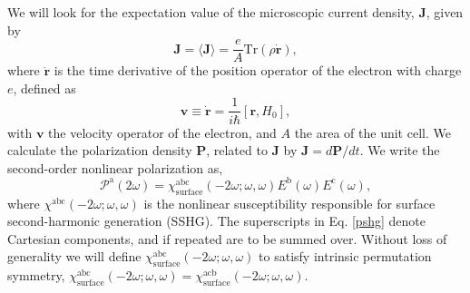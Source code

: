 We will look for the expectation value of the microscopic current density,
$\mathbf{J}$, given by
\begin{equation*}
\mathbf{J} = \langle{\mathbf{J}}\rangle 
           = \frac{e}{A}\mathrm{Tr}({\rho}\dot{\mathbf{r}}),
\end{equation*}
where $\dot{\mathbf{r}}$ is the time derivative of the position operator of the
electron with charge $e$, defined as
\begin{equation}
\mathbf{v}\equiv \dot{\mathbf{r}}=\frac{1}{i\hbar }[\mathbf{r},H_0],  
\label{mv}
\end{equation}
with $\mathbf{v}$ the velocity operator of the electron, and $A$ the area of the
unit cell. We calculate the polarization density $\mathbf{P}$, related to
$\mathbf{J}$ by $\mathbf{J}=d\mathbf{P}/dt$. We write the second-order nonlinear
polarization as,
\begin{equation}\label{pshg}
\boldsymbol{\mathcal{P}}^{\mathrm{a}}(2\omega)=
\chi^{\mathrm{abc}}_{\mathrm{surface}}(-2\omega;\omega,\omega)
E^{\mathrm{b}}(\omega)E^{\mathrm{c}}(\omega),  
\end{equation}
where $\chi^{\mathrm{a}\mathrm{b}\mathrm{c}}(-2\omega ;\omega ,\omega )$ is the
nonlinear susceptibility responsible for surface second-harmonic generation
(SSHG). The superscripts in Eq. \eqref{pshg} denote Cartesian components, and if
repeated are to be summed over. Without loss of generality we will define
$\chi^{\mathrm{abc}}_{\mathrm{surface}}(-2\omega;\omega,\omega)$ to satisfy
intrinsic permutation symmetry,
$\chi^{\mathrm{abc}}_{\mathrm{surface}}(-2\omega;\omega ,\omega )
=\chi^{\mathrm{acb}}_{\mathrm{surface}}(-2\omega ;\omega,\omega )$.

